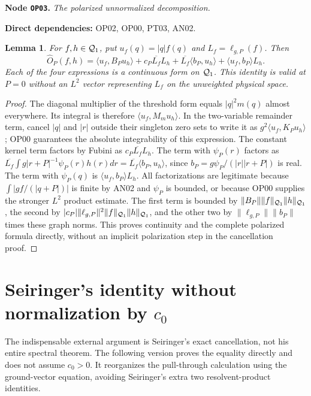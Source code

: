 \documentclass[11pt,a4paper]{article}
\newtheorem{lemma}[theorem]{Lemma}
\theoremstyle{remark}\newtheorem{remark}[theorem]{Remark}
\newcommand{\node}[3]{\par\Needspace{6\baselineskip}\smallskip\hypertarget{node:#1}{}\label{nodepage:#1}\noindent\textbf{Node \texttt{#1}.} \textit{#2.}\par\noindent\textbf{Direct dependencies:} #3.\par}
\begin{document}
\node{OP03}{The polarized unnormalized decomposition}{OP02, OP00, PT03, AN02}
\begin{lemma}\label{lem:polarizedO}
For $f,h\in\mathcal Q_1$, put $u_f(q)=|q|f(q)$ and $L_f=\ell_{g,P}(f)$. Then
\begin{equation}
 \widehat O_P(f,h)=\langle u_f,B_Pu_h\rangle
 +c_P\overline{L_f}L_h
 +\overline{L_f}\langle b_P,u_h\rangle
 +\langle u_f,b_P\rangle L_h.
 \label{eq:polarizedO}
\end{equation}
Each of the four expressions is a continuous form on $\mathcal Q_1$. This identity is valid at $P=0$ without an $L^2$ vector representing $L_f$ on the unweighted physical space.
\end{lemma}
\begin{proof}
The diagonal multiplier of the threshold form equals $|q|^2m(q)$ almost everywhere. Its integral is therefore $\langle u_f,M_m u_h\rangle$. In the two-variable remainder term, cancel $|q|$ and $|r|$ outside their singleton zero sets to write it as $g^2\langle u_f,K_Pu_h\rangle$; OP00 guarantees the absolute integrability of this expression. The constant kernel term factors by Fubini as $c_P\overline{L_f}L_h$. The term with $\psi_P(r)$ factors as
$\overline{L_f}\int g|r+P|^{-1}\psi_P(r)h(r)dr
=\overline{L_f}\langle b_P,u_h\rangle$,
since $b_P=g\psi_P/(|r||r+P|)$ is real. The term with $\psi_P(q)$ is $\langle u_f,b_P\rangle L_h$. All factorizations are legitimate because $\int|g f/(|q+P|)|$ is finite by AN02 and $\psi_P$ is bounded, or because OP00 supplies the stronger $L^2$ product estimate. The first term is bounded by $\|B_P\|\|f\|_{\mathcal Q_1}\|h\|_{\mathcal Q_1}$, the second by $|c_P|\|\ell_{g,P}\|^2\|f\|_{\mathcal Q_1}\|h\|_{\mathcal Q_1}$, and the other two by $\|\ell_{g,P}\|\|b_P\|$ times these graph norms. This proves continuity and the complete polarized formula directly, without an implicit polarization step in the cancellation proof.
\end{proof}

\section{Seiringer's identity without normalization by \texorpdfstring{$c_0$}{c0}}\label{sec:seiringer}
The indispensable external argument is Seiringer's exact cancellation, not his entire spectral theorem. The following version proves the equality directly and does not assume $c_0>0$. It reorganizes the pull-through calculation using the ground-vector equation, avoiding Seiringer's extra two resolvent-product identities.
\end{document}

